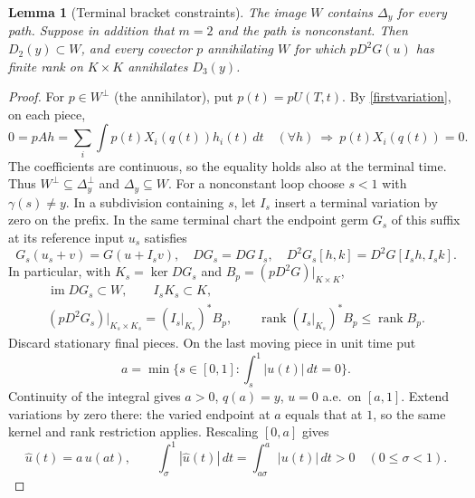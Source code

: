 \documentclass[11pt,letterpaper]{article}
\newtheorem{lemma}[theorem]{Lemma}
\newcommand{\im}{\operatorname{im}}
\newcommand{\rank}{\operatorname{rank}}
\begin{document}
\begin{lemma}[Terminal bracket constraints]\label{flags}
The image $W$ contains $\Delta_y$ for every path. Suppose in addition
that $m=2$ and the path is nonconstant. Then $D_2(y)\subset W$, and
every covector $p$ annihilating $W$ for which $pD^2G(u)$ has finite
rank on $K\times K$ annihilates $D_3(y)$.
\end{lemma}
\begin{proof}
For $p\in W^\perp$ (the annihilator), put $p(t)=pU(T,t)$. By
\eqref{firstvariation}, on each piece,
\[
 0=pAh=\sum_i\int p(t)X_i(q(t))h_i(t)\,dt\quad(\forall h)
 \ \Longrightarrow\ p(t)X_i(q(t))=0 .
\]
The coefficients are continuous, so the equality holds also at the
terminal time. Thus $W^\perp\subseteq\Delta_y^\perp$ and $\Delta_y\subseteq W$.
For a nonconstant loop choose $s<1$ with $\gamma(s)\ne y$.
In a subdivision
containing $s$, let $I_s$ insert a terminal variation by zero on the
prefix. In the same terminal chart the endpoint germ $G_s$ of this
suffix at its reference input $u_s$ satisfies
\[
 G_s(u_s+v)=G(u+I_sv),\quad
 DG_s=DG\,I_s,\quad D^2G_s[h,k]=D^2G[I_sh,I_sk].
\]
In particular, with $K_s=\ker DG_s$ and $B_p=(pD^2G)|_{K\times K}$,
\[
 \begin{gathered}
 \im DG_s\subset W,\qquad I_sK_s\subset K,\\
 (pD^2G_s)|_{K_s\times K_s}=(I_s|_{K_s})^*B_p,\qquad
 \rank (I_s|_{K_s})^*B_p\le\rank B_p .
 \end{gathered}
\]
Discard stationary final pieces. On the last moving piece in unit time put
\[
 a=\min\{s\in[0,1]:\int_s^1|u(t)|\,dt=0\}.
\]
Continuity of the integral gives $a>0$, $q(a)=y$, $u=0$ a.e.\ on $[a,1]$.
Extend variations by zero there: the varied endpoint at $a$ equals that at
$1$, so the same kernel and rank restriction applies. Rescaling $[0,a]$ gives
\[
 \widehat u(t)=a\,u(at),\qquad
 \int_\sigma^1|\widehat u(t)|\,dt=\int_{a\sigma}^a|u(t)|\,dt>0
                  \quad(0\le\sigma<1).
\]


\end{proof}
\end{document}
